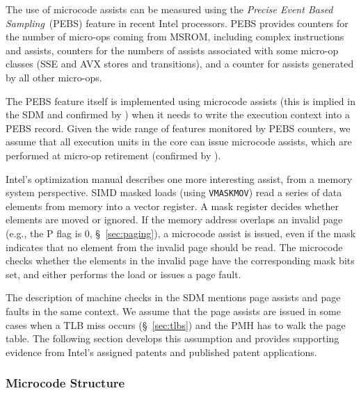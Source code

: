 
The use of microcode assists can be measured using the \textit{Precise Event
Based Sampling}~(PEBS) feature in recent Intel processors. PEBS provides
counters for the number of micro-ops coming from MSROM, including complex
instructions and assists, counters for the numbers of assists associated with
some micro-op classes (SSE and AVX stores and transitions), and a counter for
assists generated by all other micro-ops.

The PEBS feature itself is implemented using microcode assists (this is implied
in the SDM and confirmed by \cite{intel2014pebs}) when it needs to write the
execution context into a PEBS record. Given the wide range of features
monitored by PEBS counters, we assume that all execution units in the core can
issue microcode assists, which are performed at micro-op retirement (confirmed
by \cite{intel1997events}).


Intel's optimization manual describes one more interesting assist, from a
memory system perspective. SIMD masked loads (using \texttt{VMASKMOV}) read a
series of data elements from memory into a vector register. A mask register
decides whether elements are moved or ignored. If the memory address overlaps
an invalid page (e.g., the P flag is 0, \S~\ref{sec:paging}), a microcode
assist is issued, even if the mask indicates that no element from the invalid
page should be read. The microcode checks whether the elements in the invalid
page have the corresponding mask bits set, and either performs the load or
issues a page fault.


The description of machine checks in the SDM mentions page assists and page
faults in the same context. We assume that the page assists are issued in some
cases when a TLB miss occurs (\S~\ref{sec:tlbs}) and the PMH has to walk the
page table. The following section develops this assumption and provides
supporting evidence from Intel's assigned patents and published patent
applications.


\subsubsection{Microcode Structure}
\label{sec:microcode_structure}

